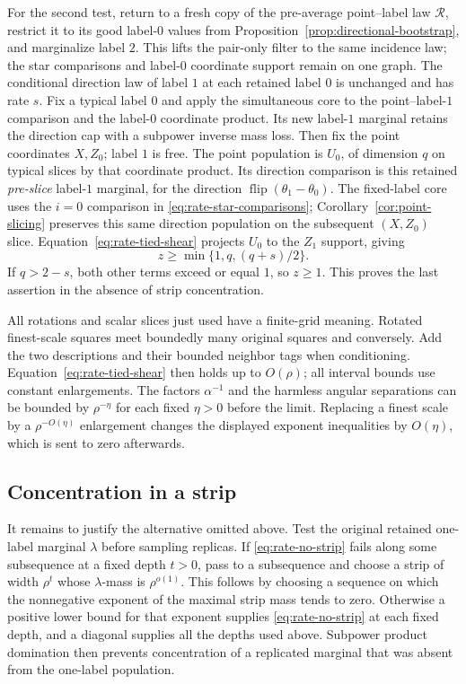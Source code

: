 For the second test, return to a fresh copy of the pre-average
point--label law $\mathcal R$, restrict it to its good label-$0$ values
from Proposition~\ref{prop:directional-bootstrap}, and marginalize
label $2$.  This lifts the pair-only filter to the same incidence law;
the star comparisons and label-$0$ coordinate support remain on one
graph.  The conditional direction law of label $1$ at each retained
label $0$ is unchanged and has rate $s$.
Fix a typical label $0$ and apply the simultaneous core to the
point--label-$1$ comparison and the label-$0$ coordinate product.
Its new label-$1$ marginal retains the direction cap with a subpower
inverse mass loss.  Then fix the point coordinates $X,Z_0$; label $1$
is free.  The point population is $U_0$, of dimension $q$ on typical
slices by that coordinate product.  Its direction comparison is this
retained \emph{pre-slice} label-$1$ marginal, for the direction
$\operatorname{flip}(\theta_1-\theta_0)$.
The fixed-label core uses the $i=0$ comparison in
\eqref{eq:rate-star-comparisons};
Corollary~\ref{cor:point-slicing} preserves this same direction
population on the subsequent $(X,Z_0)$ slice.
Equation~\eqref{eq:rate-tied-shear} projects $U_0$ to the $Z_1$
support, giving
\begin{equation}\label{eq:rate-tied-q}
 z\ge\min\{1,q,(q+s)/2\}.
\end{equation}
If $q>2-s$, both other terms exceed or equal $1$, so $z\ge1$.
This proves the last assertion in the absence of strip concentration.

All rotations and scalar slices just used have a finite-grid meaning.
Rotated finest-scale squares meet boundedly many original squares
and conversely. Add the two descriptions and their bounded neighbor
tags when conditioning. Equation~\eqref{eq:rate-tied-shear} then
holds up to $O(\rho)$; all interval bounds use constant enlargements.
The factors $\alpha^{-1}$ and the harmless angular separations can
be bounded by $\rho^{-\eta}$ for each fixed $\eta>0$ before the
limit. Replacing a finest scale by a $\rho^{-O(\eta)}$ enlargement
changes the displayed exponent inequalities by $O(\eta)$, which is
sent to zero afterwards.

\subsection{Concentration in a strip}

It remains to justify the alternative omitted above. Test the original
retained one-label marginal $\lambda$ before sampling replicas. If
\eqref{eq:rate-no-strip} fails along some subsequence at a fixed
depth $t>0$, pass to a subsequence and choose a strip of width
$\rho^t$ whose $\lambda$-mass is $\rho^{o(1)}$. This follows
by choosing a sequence on which the nonnegative exponent of the
maximal strip mass tends to zero. Otherwise a positive lower bound
for that exponent supplies \eqref{eq:rate-no-strip} at each fixed
depth, and a diagonal supplies all the depths used above. Subpower
product domination then prevents concentration of a replicated
marginal that was absent from the one-label population.

